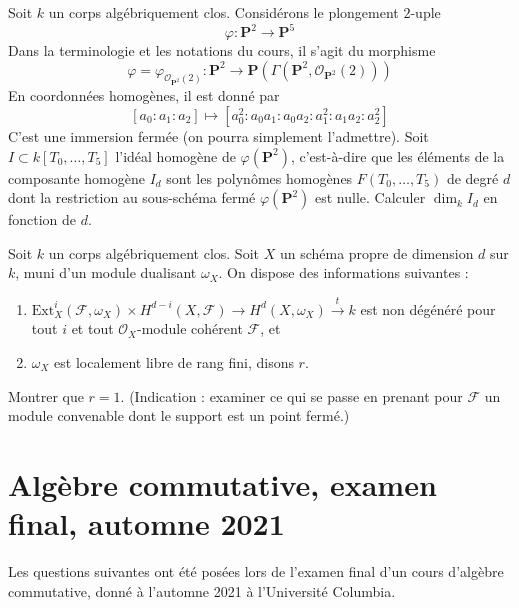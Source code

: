 \begin{exercise}
\label{exercise-number-equations}
Soit $k$ un corps algébriquement clos. Considérons le plongement $2$-uple
$$
\varphi : \mathbf{P}^2 \longrightarrow \mathbf{P}^5
$$
Dans la terminologie et les notations du cours, il s'agit du morphisme
$$
\varphi = \varphi_{\mathcal{O}_{\mathbf{P}^2}(2)} :
\mathbf{P}^2
\longrightarrow
\mathbf{P}(\Gamma(\mathbf{P}^2, \mathcal{O}_{\mathbf{P}^2}(2)))
$$
En coordonnées homogènes, il est donné par
$$
[a_0 : a_1 : a_2] \longmapsto
[a_0^2 : a_0a_1 : a_0a_2 : a_1^2 : a_1a_2 : a_2^2]
$$
C'est une immersion fermée (on pourra simplement l'admettre).
Soit $I \subset k[T_0, \ldots, T_5]$ l'idéal homogène
de $\varphi(\mathbf{P}^2)$, c'est-à-dire que les éléments de la
composante homogène $I_d$ sont les
polynômes homogènes $F(T_0, \ldots, T_5)$ de degré $d$ dont la
restriction au sous-schéma fermé $\varphi(\mathbf{P}^2)$ est nulle.
Calculer $\dim_k I_d$ en fonction de $d$.
\end{exercise}

\begin{exercise}
\label{exercise-dualizing-sheaf-rank-1}
Soit $k$ un corps algébriquement clos. Soit $X$ un schéma propre de
dimension $d$ sur $k$, muni d'un module dualisant $\omega_X$.
On dispose des informations suivantes :
\begin{enumerate}
\item $\text{Ext}^i_X(\mathcal{F}, \omega_X) \times
H^{d - i}(X, \mathcal{F}) \to H^d(X, \omega_X) \xrightarrow{t} k$
est non dégénéré pour tout $i$ et tout $\mathcal{O}_X$-module cohérent
$\mathcal{F}$, et
\item $\omega_X$ est localement libre de rang fini, disons $r$.
\end{enumerate}
Montrer que $r = 1$. (Indication : examiner ce qui se passe en prenant pour $\mathcal{F}$
un module convenable dont le support est un point fermé.)
\end{exercise}







\section{Algèbre commutative, examen final, automne 2021}
\label{section-final-exam-fall-2021}

\noindent
Les questions suivantes ont été posées lors de l'examen final d'un cours d'algèbre commutative,
donné à l'automne 2021 à l'Université Columbia.

